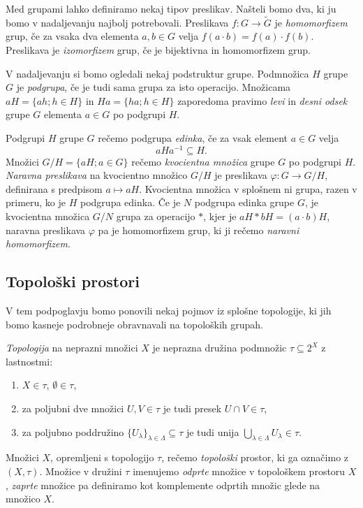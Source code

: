 \documentclass[mat1]{fmfdelo}
\begin{document}
Med grupami lahko definiramo nekaj tipov preslikav. Našteli bomo dva, ki ju bomo v nadaljevanju najbolj potrebovali.
Preslikava $f\colon G \to \widetilde{G}$ je \emph{homomorfizem} grup, če za vsaka dva elementa $a, b \in G$ velja $f(a\cdot b) = f(a)\cdot f(b)$.
Preslikava je \emph{izomorfizem} grup, če je bijektivna in homomorfizem grup.

V nadaljevanju si bomo ogledali nekaj podstruktur grupe.
Podmnožica $H$ grupe $G$ je \emph{podgrupa}, če je tudi sama grupa za isto operacijo.
Množicama $aH = \lbrace ah ; h \in H \rbrace$ in $Ha = \lbrace ha ; h \in H \rbrace$ zaporedoma pravimo \emph{levi} in \emph{desni odsek} grupe $G$ elementa $a \in G$ po podgrupi $H$.

Podgrupi $H$ grupe $G$ rečemo podgrupa \emph{edinka}, če za vsak element $a \in G$ velja \[aHa^{-1} \subseteq H.\]
Množici $G/H = \lbrace aH ; a \in G \rbrace$ rečemo \emph{kvocientna množica} grupe $G$ po podgrupi $H$.
\emph{Naravna preslikava} na kvocientno množico $G/H$ je preslikava $\varphi\colon G \to G/H$, definirana s predpisom $a \mapsto aH$.
Kvocientna množica v splošnem ni grupa, razen v primeru, ko je $H$ podgrupa edinka.
Če je $N$ podgrupa edinka grupe $G$, je kvocientna množica $G/N$ grupa za operacijo $*$, kjer je $aH*bH = (a\cdot b)H$, naravna preslikava $\varphi$ pa je homomorfizem grup, ki ji rečemo \emph{naravni homomorfizem}.

\subsection{Topološki prostori}
V tem podpoglavju bomo ponovili nekaj pojmov iz splo\-šne topologije, ki jih bomo kasneje podrobneje obravnavali na topoloških grupah.

\emph{Topologija} na neprazni množici $X$ je neprazna družina podmnožic $\tau \subseteq 2^X$ z lastnostmi:
\begin{enumerate}
\item $X \in \tau$, $\emptyset \in \tau$,
\item za poljubni dve množici $U,V \in \tau$ je tudi presek $U \cap V \in \tau$,
\item za poljubno poddružino $\lbrace U_{\lambda} \rbrace_{\lambda \in \Lambda} \subseteq \tau$ je tudi unija $\bigcup\limits_{\lambda \in \Lambda}^{} U_{\lambda} \in \tau$.
\end{enumerate}
Množici $X$, opremljeni s topologijo $\tau$, rečemo \emph{topološki} prostor, ki ga označimo z $(X, \tau)$. Množice v družini $\tau$ imenujemo \emph{odprte} množice v topološkem prostoru $X$, \emph{zaprte} množice pa definiramo kot komplemente odprtih množic glede na množico $X$.
\end{document}
